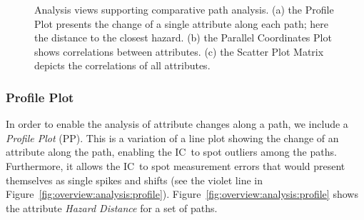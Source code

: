 \documentclass{egpubl}
\def\IC{IC}
\begin{document}
\begin{figure}
	\centering
	\hfill
	\hfill
	\caption{Analysis views supporting comparative path analysis. (a) the Profile Plot presents the change of a single attribute along each path; here the distance to the closest hazard. (b) the Parallel Coordinates Plot shows correlations between attributes. (c) the Scatter Plot Matrix depicts the correlations of all attributes.}
\end{figure}

\subsubsection{Profile Plot} \label{sec:overview:analysis:profile}
In order to enable the analysis of attribute changes along a path, we include a \emph{Profile Plot} (PP). This is a variation of a line plot showing the change of an attribute along the path, enabling the \IC\ to spot outliers among the paths. Furthermore, it allows the \IC\ to spot measurement errors that would present themselves as single spikes and shifts (see the violet line in Figure~\ref{fig:overview:analysis:profile}). Figure~\ref{fig:overview:analysis:profile} shows the attribute \emph{Hazard Distance} for a set of paths.
\end{document}
